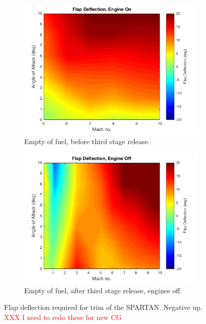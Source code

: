 \begin{figure}[ht]
\begin{subfigure}{.5\textwidth}
			\end{subfigure}
			\begin{subfigure}{.5\textwidth}
				\centering
				\includegraphics[width=0.99\linewidth]{figures/3_vehicle_design/FlapEngineCG3}
				\caption{Empty of fuel, before third stage release.}
				
			\end{subfigure}
			\begin{subfigure}{.5\textwidth}
				\centering
				\includegraphics[width=0.99\linewidth]{figures/3_vehicle_design/FlapNoEngineCG4}
				\caption{Empty of fuel, after third stage release, engines off.}
				
			\end{subfigure}
			\caption{Flap deflection required for trim of the SPARTAN. Negative up. \textcolor{red}{XXX I need to redo these for new CG}}
			\label{fig:FlapDeflection}
		\end{figure}
		
